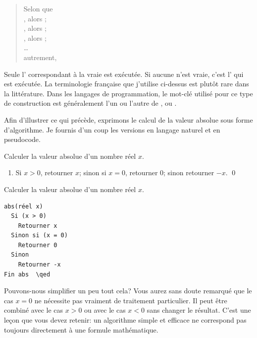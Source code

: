 \begin{itemize}
  \begin{quote}
    Selon que \\
    , alors ; \\
    , alors ; \\
    , alors ; \\
    \dots \\
    autrement, 
  \end{quote}
  Seule l' correspondant à la  vraie est
  exécutée. Si aucune  n'est vraie, c'est
  l' qui est exécutée. La terminologie
  française que j'utilise ci-dessus est plutôt rare dans la
  littérature. Dans les langages de programmation, le mot-clé utilisé
  pour ce type de construction est généralement l'un ou l'autre
  de ,  ou .
\end{itemize}

Afin d'illustrer ce qui précède, exprimons le calcul de la valeur
absolue sous forme d'algorithme. Je fournis d'un coup les versions en
langage naturel et en pseudocode.

\begin{multicols}{2}
  \raggedcolumns
  \begin{algorithme}
    \label{algo:algorithmes:abs}
    Calculer la valeur absolue d'un nombre réel $x$.
    \begin{enumerate}
    \item Si $x > 0$, retourner $x$; sinon si $x = 0$, retourner $0$;
      sinon retourner $-x$. \qed
    \end{enumerate}
  \end{algorithme}
  \columnbreak
  \addtocounter{algorithme}{-1}
  \begin{algorithme}[Pseudocode]
    Calculer la valeur absolue d'un nombre réel $x$.
    \begin{pseudocode}
\begin{Verbatim}[commandchars=\\\{\}]
abs(réel x)
  Si (x > 0)
    Retourner x
  Sinon si (x = 0)
    Retourner 0
  Sinon
    Retourner -x
Fin abs  \qed
\end{Verbatim}
    \end{pseudocode}
  \end{algorithme}
\end{multicols}

Pouvons-nous simplifier un peu tout cela? Vous aurez sans doute
remarqué que le cas $x = 0$ ne nécessite pas vraiment de traitement
particulier. Il peut être combiné avec le cas $x > 0$ ou avec le cas
$x < 0$ sans changer le résultat. C'est une leçon que vous devez
retenir: un algorithme simple et efficace ne correspond pas toujours
directement à une formule mathématique.

